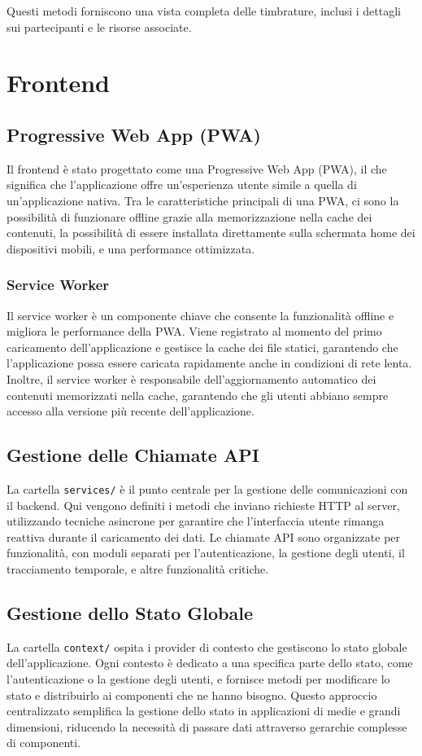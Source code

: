 \documentclass[twoside]{supsistudent}
\begin{document}
Questi metodi forniscono una vista completa delle timbrature, inclusi i dettagli sui partecipanti e le risorse associate.

\section{Frontend}

\subsection{Progressive Web App (PWA)}
Il frontend è stato progettato come una Progressive Web App (PWA)\cite{pettiboy2024}, il che significa che l'applicazione offre un'esperienza utente simile a quella di un'applicazione nativa. Tra le caratteristiche principali di una PWA, ci sono la possibilità di funzionare offline grazie alla memorizzazione nella cache dei contenuti, la possibilità di essere installata direttamente sulla schermata home dei dispositivi mobili, e una performance ottimizzata.

\subsubsection{Service Worker}
Il service worker è un componente chiave che consente la funzionalità offline e migliora le performance della PWA. Viene registrato al momento del primo caricamento dell'applicazione e gestisce la cache dei file statici, garantendo che l'applicazione possa essere caricata rapidamente anche in condizioni di rete lenta. Inoltre, il service worker è responsabile dell'aggiornamento automatico dei contenuti memorizzati nella cache, garantendo che gli utenti abbiano sempre accesso alla versione più recente dell'applicazione.


\subsection{Gestione delle Chiamate API}
La cartella \texttt{services/} è il punto centrale per la gestione delle comunicazioni con il backend. Qui vengono definiti i metodi che inviano richieste HTTP al server, utilizzando tecniche asincrone per garantire che l'interfaccia utente rimanga reattiva durante il caricamento dei dati. Le chiamate API sono organizzate per funzionalità, con moduli separati per l'autenticazione, la gestione degli utenti, il tracciamento temporale, e altre funzionalità critiche.

\subsection{Gestione dello Stato Globale}
La cartella \texttt{context/} ospita i provider di contesto che gestiscono lo stato globale dell'applicazione. Ogni contesto è dedicato a una specifica parte dello stato, come l'autenticazione o la gestione degli utenti, e fornisce metodi per modificare lo stato e distribuirlo ai componenti che ne hanno bisogno. Questo approccio centralizzato semplifica la gestione dello stato in applicazioni di medie e grandi dimensioni, riducendo la necessità di passare dati attraverso gerarchie complesse di componenti.
\end{document}
